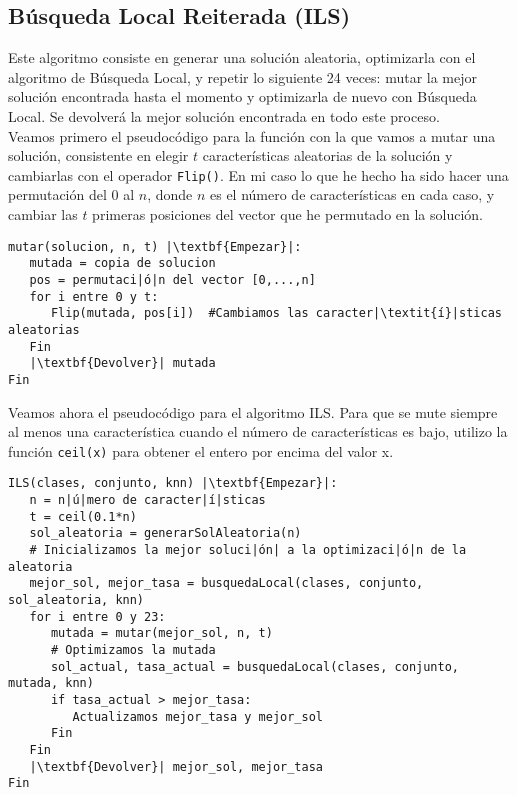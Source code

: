 \documentclass[12pt]{article}
\begin{document}
\subsection{Búsqueda Local Reiterada (ILS)}

Este algoritmo consiste en generar una solución aleatoria, optimizarla con el algoritmo de Búsqueda Local, y repetir lo siguiente 24 veces: mutar la mejor solución encontrada hasta el momento y optimizarla de nuevo con Búsqueda Local. Se devolverá la mejor solución encontrada en todo este proceso.\\

Veamos primero el pseudocódigo para la función con la que vamos a mutar una solución, consistente en elegir $t$ características aleatorias de la solución y cambiarlas con el operador \texttt{Flip()}. En mi caso lo que he hecho ha sido hacer una permutación del 0 al $n$, donde $n$ es el número de características en cada caso, y cambiar las $t$ primeras posiciones del vector que he permutado en la solución.

\begin{lstlisting}
mutar(solucion, n, t) |\textbf{Empezar}|:
   mutada = copia de solucion
   pos = permutaci|ó|n del vector [0,...,n]
   for i entre 0 y t:
      Flip(mutada, pos[i])	#Cambiamos las caracter|\textit{í}|sticas aleatorias
   Fin
   |\textbf{Devolver}| mutada
Fin

\end{lstlisting}

Veamos ahora el pseudocódigo para el algoritmo ILS. Para que se mute siempre al menos una característica cuando el número de características es bajo, utilizo la función \texttt{ceil(x)} para obtener el entero por encima del valor x.
\begin{lstlisting}
ILS(clases, conjunto, knn) |\textbf{Empezar}|:
   n = n|ú|mero de caracter|í|sticas
   t = ceil(0.1*n)
   sol_aleatoria = generarSolAleatoria(n)
   # Inicializamos la mejor soluci|ón| a la optimizaci|ó|n de la aleatoria 
   mejor_sol, mejor_tasa = busquedaLocal(clases, conjunto, sol_aleatoria, knn)
   for i entre 0 y 23:
      mutada = mutar(mejor_sol, n, t)
      # Optimizamos la mutada
      sol_actual, tasa_actual = busquedaLocal(clases, conjunto, mutada, knn)
      if tasa_actual > mejor_tasa:
         Actualizamos mejor_tasa y mejor_sol
      Fin
   Fin
   |\textbf{Devolver}| mejor_sol, mejor_tasa
Fin

\end{lstlisting}

\newpage
\end{document}
